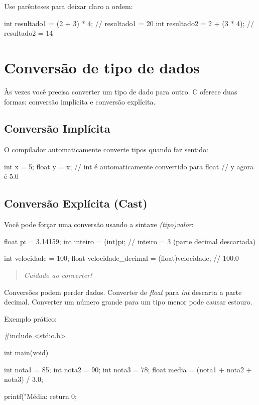 Use parênteses para deixar claro a ordem:

\begin{ccode}
  int resultado1 = (2 + 3) * 4;  // resultado1 = 20
  int resultado2 = 2 + (3 * 4);  // resultado2 = 14
\end{ccode}

\section{Conversão de tipo de dados}

Às vezes você precisa converter um tipo de dado para outro. C oferece duas formas: conversão implícita e conversão explícita.

\subsection{Conversão Implícita}

O compilador automaticamente converte tipos quando faz sentido:

\begin{ccode}
  int x = 5;
  float y = x;  // int é automaticamente convertido para float
  // y agora é 5.0
\end{ccode}

\subsection{Conversão Explícita (Cast)}

Você pode forçar uma conversão usando a sintaxe \textit{(tipo)valor}:

\begin{ccode}
  float pi = 3.14159;
  int inteiro = (int)pi;  // inteiro = 3 (parte decimal descartada)

  int velocidade = 100;
  float velocidade_decimal = (float)velocidade;  // 100.0
\end{ccode}

\begin{quote}
\textit{Cuidado ao converter!}
\end{quote}

Conversões podem perder dados. Converter de \textit{float} para \textit{int} descarta a parte decimal. Converter um número grande para um tipo menor pode causar estouro.

Exemplo prático:

\begin{ccode}
  #include <stdio.h>

  int main(void)
  {
    int nota1 = 85;
    int nota2 = 90;
    int nota3 = 78;
    float media = (nota1 + nota2 + nota3) / 3.0;

    printf("Média: %
    return 0;
  }
\end{ccode}

